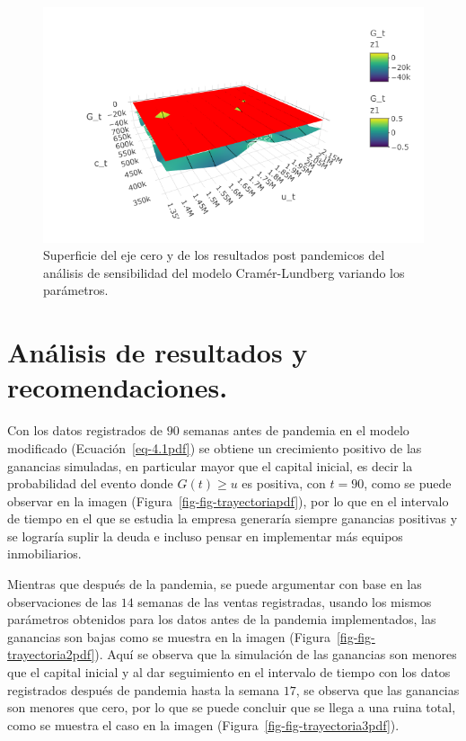 \documentclass[
  us-letterpaper,
]{scrreprt}
\theoremstyle{plain}
\theoremstyle{plain}
\theoremstyle{definition}
\theoremstyle{remark}
\begin{document}
\begin{figure}[H]

{\centering \includegraphics[width=6.25in,height=\textheight,keepaspectratio]{fig-analisis3pdf.png}

}

\caption{Superficie del eje cero y de los resultados post pandemicos del
análisis de sensibilidad del modelo Cramér-Lundberg variando los
parámetros.}

\end{figure}%

\section{Análisis de resultados y
recomendaciones.}\label{anuxe1lisis-de-resultados-y-recomendaciones.}

Con los datos registrados de \(90\) semanas antes de pandemia en el
modelo modificado (Ecuación~\ref{eq-4.1pdf}) se obtiene un crecimiento
positivo de las ganancias simuladas, en particular mayor que el capital
inicial, es decir la probabilidad del evento donde \(G(t)\geq u\) es
positiva, con \(t=90\), como se puede observar en la imagen
(Figura~\ref{fig-fig-trayectoriapdf}), por lo que en el intervalo de
tiempo en el que se estudia la empresa generaría siempre ganancias
positivas y se lograría suplir la deuda e incluso pensar en implementar
más equipos inmobiliarios.

Mientras que después de la pandemia, se puede argumentar con base en las
observaciones de las \(14\) semanas de las ventas registradas, usando
los mismos parámetros obtenidos para los datos antes de la pandemia
implementados, las ganancias son bajas como se muestra en la imagen
(Figura~\ref{fig-fig-trayectoria2pdf}). Aquí se observa que la
simulación de las ganancias son menores que el capital inicial y al dar
seguimiento en el intervalo de tiempo con los datos registrados después
de pandemia hasta la semana \(17\), se observa que las ganancias son
menores que cero, por lo que se puede concluir que se llega a una ruina
total, como se muestra el caso en la imagen
(Figura~\ref{fig-fig-trayectoria3pdf}).
\end{document}
